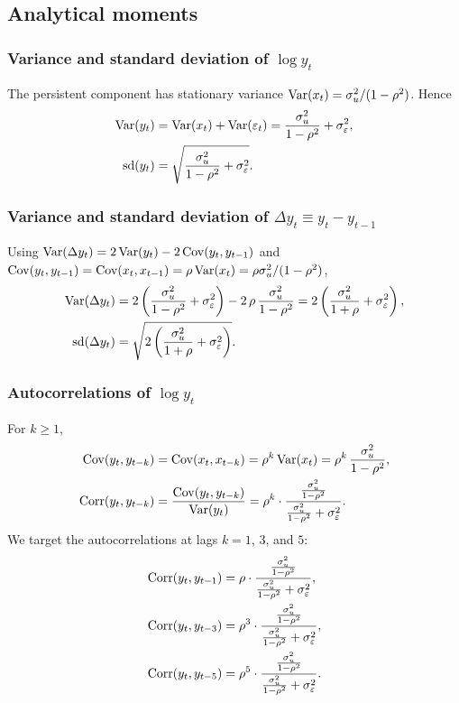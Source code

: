 \subsection{Analytical moments}

\subsubsection{Variance and standard deviation of $\log y_t$}

The persistent component has stationary variance $\operatorname{Var}(x_t) = \sigma_u^2/(1-\rho^2)$. Hence
\begin{align*}
  \operatorname{Var}(y_t) &= \operatorname{Var}(x_t) + \operatorname{Var}(\varepsilon_t)
  = \frac{\sigma_u^2}{1-\rho^2} + \sigma_\varepsilon^2, \\
  \operatorname{sd}(y_t) &= \sqrt{\frac{\sigma_u^2}{1-\rho^2} + \sigma_\varepsilon^2}.
\end{align*}

\subsubsection{Variance and standard deviation of $\Delta y_t \equiv y_t - y_{t-1}$}

Using $\operatorname{Var}(\Delta y_t) = 2\operatorname{Var}(y_t) - 2\operatorname{Cov}(y_t,y_{t-1})$ and $\operatorname{Cov}(y_t,y_{t-1}) = \operatorname{Cov}(x_t,x_{t-1}) = \rho \operatorname{Var}(x_t) = \rho \sigma_u^2/(1-\rho^2)$,
\begin{align*}
  \operatorname{Var}(\Delta y_t)
  &= 2\left(\frac{\sigma_u^2}{1-\rho^2}+\sigma_\varepsilon^2\right)
  - 2\,\rho\,\frac{\sigma_u^2}{1-\rho^2}
  = 2\left(\frac{\sigma_u^2}{1+\rho}+\sigma_\varepsilon^2\right), \\
  \operatorname{sd}(\Delta y_t) &= \sqrt{2\left(\frac{\sigma_u^2}{1+\rho}+\sigma_\varepsilon^2\right)}.
\end{align*}

\subsubsection{Autocorrelations of $\log y_t$}

For $k \ge 1$,
\begin{align*}
  \operatorname{Cov}(y_t,y_{t-k})
  &= \operatorname{Cov}(x_t,x_{t-k})
  = \rho^k \operatorname{Var}(x_t)
  = \rho^k \,\frac{\sigma_u^2}{1-\rho^2}, \\
  \operatorname{Corr}(y_t,y_{t-k})
  &= \frac{\operatorname{Cov}(y_t,y_{t-k})}{\operatorname{Var}(y_t)}
  = \rho^k \cdot \frac{\frac{\sigma_u^2}{1-\rho^2}}{\frac{\sigma_u^2}{1-\rho^2}+\sigma_\varepsilon^2}.
\end{align*}
We target the autocorrelations at lags $k=1$, $3$, and $5$:
\begin{align*}
  \operatorname{Corr}(y_t,y_{t-1}) &= \rho \cdot \frac{\frac{\sigma_u^2}{1-\rho^2}}{\frac{\sigma_u^2}{1-\rho^2}+\sigma_\varepsilon^2}, \\
  \operatorname{Corr}(y_t,y_{t-3}) &= \rho^3 \cdot \frac{\frac{\sigma_u^2}{1-\rho^2}}{\frac{\sigma_u^2}{1-\rho^2}+\sigma_\varepsilon^2}, \\
  \operatorname{Corr}(y_t,y_{t-5}) &= \rho^5 \cdot \frac{\frac{\sigma_u^2}{1-\rho^2}}{\frac{\sigma_u^2}{1-\rho^2}+\sigma_\varepsilon^2}.
\end{align*}

